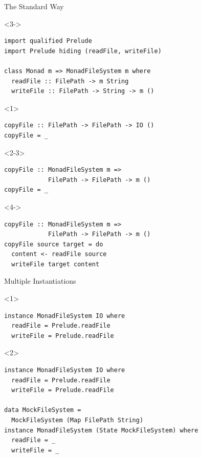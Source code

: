 \documentclass{beamer}
\begin{document}
\begin{frame}[fragile]{The Standard Way}
\begin{visibleenv}<3->
\begin{verbatim}
import qualified Prelude
import Prelude hiding (readFile, writeFile)

class Monad m => MonadFileSystem m where
  readFile :: FilePath -> m String
  writeFile :: FilePath -> String -> m ()
\end{verbatim}
\end{visibleenv}

\vspace{1.5em}

\begin{onlyenv}<1>
\begin{verbatim}
copyFile :: FilePath -> FilePath -> IO ()
copyFile = _ 
\end{verbatim}
\end{onlyenv}

\begin{onlyenv}<2-3>
\begin{verbatim}
copyFile :: MonadFileSystem m =>
            FilePath -> FilePath -> m ()
copyFile = _ 
\end{verbatim}
\end{onlyenv}

\begin{visibleenv}<4->
\begin{verbatim}
copyFile :: MonadFileSystem m =>
            FilePath -> FilePath -> m ()
copyFile source target = do
  content <- readFile source
  writeFile target content
\end{verbatim}
\end{visibleenv}
\end{frame}

\begin{frame}[fragile]{Multiple Instantiations}
\begin{visibleenv}<1>
\begin{verbatim}
instance MonadFileSystem IO where
  readFile = Prelude.readFile
  writeFile = Prelude.readFile
\end{verbatim}
\end{visibleenv}
\begin{onlyenv}<2>
\begin{verbatim}
instance MonadFileSystem IO where
  readFile = Prelude.readFile
  writeFile = Prelude.readFile

data MockFileSystem =
  MockFileSystem (Map FilePath String)
instance MonadFileSystem (State MockFileSystem) where
  readFile = _
  writeFile = _
\end{verbatim}
\end{onlyenv}
\end{frame}
\end{document}
